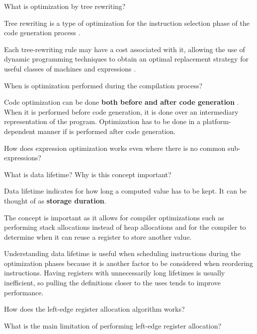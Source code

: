 \begin{Exercise}
What is optimization by tree rewriting?
\end{Exercise}
\begin{Answer}
Tree rewriting is a type of optimization for the instruction selection phase of the code generation process \cite[p.~558]{compilers-aho-2007}.

Each tree-rewriting rule may have a cost associated with it, allowing the use of dynamic programming techniques to obtain an optimal replacement strategy for useful classes of machines and expressions \cite[p.~579]{compilers-aho-2007}.
\end{Answer}

\begin{Exercise}
When is optimization performed during the compilation process?
\end{Exercise}
\begin{Answer}
Code optimization can be done \textbf{both before and after code generation} \cite[p.~5]{compilers-aho-2007}.
When it is performed before code generation, it is done over an intermediary representation of the program.
Optimization has to be done in a platform-dependent manner if is performed after code generation.
\end{Answer}

\begin{Exercise}
How does expression optimization works even where there is no common sub-expressions?
\end{Exercise}

\begin{Exercise}[difficulty=1]
What is data lifetime? Why is this concept important?
\end{Exercise}
\begin{Answer}
Data lifetime indicates for how long a computed value has to be kept.
It can be thought of as \textbf{storage duration}.

The concept is important as it allows for compiler optimizations such as performing stack allocations instead of heap allocations and for the compiler to determine when it can reuse a register to store another value.

Understanding data lifetime is useful when scheduling instructions during the optimization phases because it is another factor to be considered when reordering instructions.
Having registers with unnecessarily long lifetimes is usually inefficient, so pulling the definitions closer to the uses tends to improve performance.
\end{Answer}

\begin{Exercise}
How does the left-edge register allocation algorithm works?
\end{Exercise}

\begin{Exercise}
What is the main limitation of performing left-edge register allocation?
\end{Exercise}